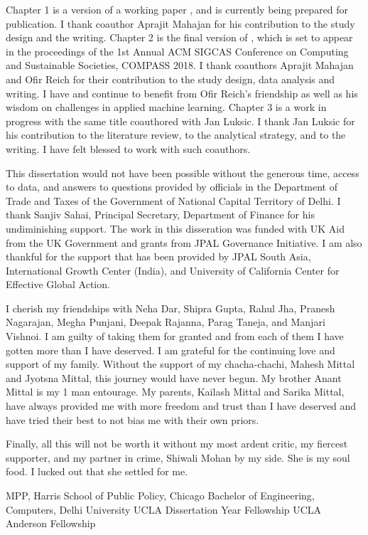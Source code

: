 {Chapter 1 is a version of a working paper \cite{mittal2017vat}, and is currently being prepared for publication. I thank coauthor Aprajit Mahajan for his contribution to the study design and the writing. Chapter 2 is the final version of \cite{mittal2018bogus}, which is set to appear in the proceedings of the 1st Annual ACM SIGCAS Conference on Computing and Sustainable Societies, COMPASS 2018. I thank coauthors Aprajit Mahajan and Ofir Reich for their contribution to the study design, data analysis and writing. I have and continue to benefit from Ofir Reich's friendship as well as his wisdom on challenges in applied machine learning. Chapter 3 is a work in progress with the same title coauthored with Jan Luksic. I thank Jan Luksic for his contribution to the literature review, to the analytical strategy, and to the writing. I have felt blessed to work with such coauthors.

This dissertation would not have been possible without the generous time, access to data, and answers to questions provided by officials in the Department of Trade and Taxes of the Government of National Capital Territory of Delhi. I thank Sanjiv Sahai, Principal Secretary, Department of Finance for his undiminishing support. The work in this disseration was funded with UK Aid from the UK Government and grants from JPAL Governance Initiative. I am also thankful for the support that has been provided by JPAL South Asia, International Growth Center (India), and University of California Center for Effective Global Action.

I cherish my friendships with  Neha Dar, Shipra Gupta, Rahul Jha, Pranesh Nagarajan, Megha Punjani, Deepak Rajanna, Parag Taneja, and Manjari Vishnoi. I am guilty of taking them for granted and from each of them I have gotten more than I have deserved. I am grateful for the continuing love and support of my family. Without the support of my chacha-chachi, Mahesh Mittal and Jyotsna Mittal, this journey would have never begun. My brother Anant Mittal is my 1 man entourage. My parents, Kailash Mittal and Sarika Mittal, have always provided me with more freedom and trust than I have deserved and have tried their best to not bias me with their own priors. 

Finally, all this will not be worth it without my most ardent critic, my fiercest supporter, and my partner in crime, Shiwali Mohan by my side. She is my soul food. I lucked out that she settled for me.}
 {}
 {MPP, Harris School of Public Policy, Chicago}
 {Bachelor of Engineering, Computers, Delhi University}
 {}
 {UCLA Dissertation Year Fellowship}
 {UCLA Anderson Fellowship\vspace{0.8cm}}

